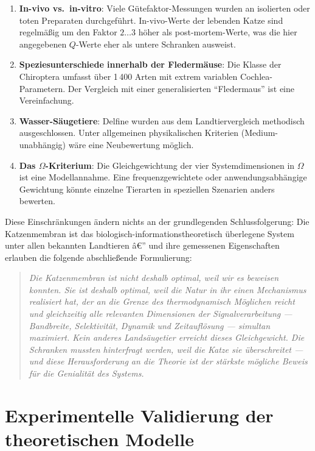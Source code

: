﻿\documentclass[12pt,a4paper,titlepage]{report}
\begin{document}
\begin{enumerate}[leftmargin=2em, label=\textbf{(E\arabic*)}]
  \item \textbf{In-vivo vs.\ in-vitro}: Viele Gütefaktor-Messungen wurden an
    isolierten oder toten Preparaten durchgeführt. In-vivo-Werte der lebenden
    Katze sind regelmäßig um den Faktor $2\ldots3$ höher als post-mortem-Werte,
    was die hier angegebenen $Q$-Werte eher als untere Schranken ausweist.
  \item \textbf{Speziesunterschiede innerhalb der Fledermäuse}: Die Klasse
    der Chiroptera umfasst über 1\,400 Arten mit extrem variablen Cochlea-Parametern.
    Der Vergleich mit einer generalisierten ``Fledermaus'' ist eine Vereinfachung.
  \item \textbf{Wasser-Säugetiere}: Delfine wurden aus dem Landtiervergleich
    methodisch ausgeschlossen. Unter allgemeinen physikalischen Kriterien
    (Medium-unabhängig) wäre eine Neubewertung möglich.
  \item \textbf{Das $\Omega$-Kriterium}: Die Gleichgewichtung der vier
    Systemdimensionen in $\Omega$ ist eine Modellannahme. Eine frequenzgewichtete
    oder anwendungsabhängige Gewichtung könnte einzelne Tierarten in speziellen
    Szenarien anders bewerten.
\end{enumerate}

Diese Einschränkungen ändern nichts an der grundlegenden Schlussfolgerung:
Die Katzenmembran ist das biologisch-informationstheoretisch überlegene System
unter allen bekannten Landtieren â€” und ihre gemessenen Eigenschaften erlauben
die folgende abschließende Formulierung:

\begin{quote}
  \itshape
  Die Katzenmembran ist nicht deshalb optimal, weil wir es beweisen konnten.
  Sie ist deshalb optimal, weil die Natur in ihr einen Mechanismus realisiert hat,
  der an die Grenze des thermodynamisch Möglichen reicht und gleichzeitig alle
  relevanten Dimensionen der Signalverarbeitung --- Bandbreite, Selektivität,
  Dynamik und Zeitauflösung --- simultan maximiert.
  Kein anderes Landsäugetier erreicht dieses Gleichgewicht.
  Die Schranken mussten hinterfragt werden, weil die Katze sie überschreitet ---
  und diese Herausforderung an die Theorie ist der stärkste mögliche Beweis
  für die Genialität des Systems.
\end{quote}

\chapter{Experimentelle Validierung der theoretischen Modelle}
\end{document}

